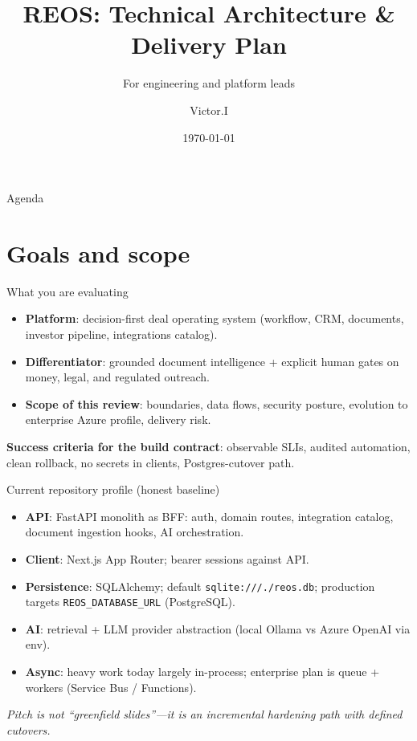 \documentclass[aspectratio=169,11pt]{beamer}
\title[REOS Architecture]{REOS: Technical Architecture \& Delivery Plan}
\subtitle{For engineering and platform leads}
\author{Victor.I}
\date{\today}
\begin{document}
\begin{frame}
  \titlepage
\end{frame}

\begin{frame}{Agenda}
  \tableofcontents
\end{frame}

\section{Goals and scope}

\begin{frame}{What you are evaluating}
  \small
  \begin{itemize}
    \item \textbf{Platform}: decision-first deal operating system (workflow, CRM, documents, investor pipeline, integrations catalog).
    \item \textbf{Differentiator}: grounded document intelligence + explicit human gates on money, legal, and regulated outreach.
    \item \textbf{Scope of this review}: boundaries, data flows, security posture, evolution to enterprise Azure profile, delivery risk.
  \end{itemize}
  \vspace{0.6em}
  \textbf{Success criteria for the build contract}: observable SLIs, audited automation, clean rollback, no secrets in clients, Postgres-cutover path.
\end{frame}

\begin{frame}{Current repository profile (honest baseline)}
  \small
  \begin{itemize}
    \item \textbf{API}: FastAPI monolith as BFF: auth, domain routes, integration catalog, document ingestion hooks, AI orchestration.
    \item \textbf{Client}: Next.js App Router; bearer sessions against API.
    \item \textbf{Persistence}: SQLAlchemy; default \texttt{sqlite:///./reos.db}; production targets \texttt{REOS\_DATABASE\_URL} (PostgreSQL).
    \item \textbf{AI}: retrieval + LLM provider abstraction (local Ollama vs Azure OpenAI via env).
    \item \textbf{Async}: heavy work today largely in-process; enterprise plan is queue + workers (Service Bus / Functions).
  \end{itemize}
  \vspace{0.5em}
  \textit{Pitch is not ``greenfield slides''---it is an incremental hardening path with defined cutovers.}
\end{frame}
\end{document}

